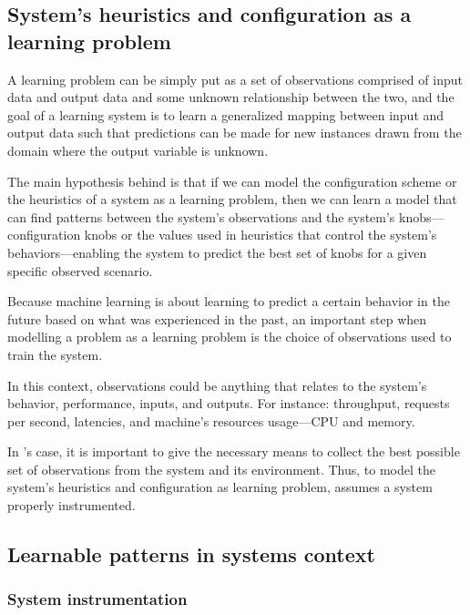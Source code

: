 
\subsection{System's heuristics and configuration as a learning problem}

A learning problem can be simply put as a set of observations comprised of input data and output data and some unknown relationship between the two, and the goal of a learning system is to learn a generalized mapping between input and output data such that predictions can be made for new instances drawn from the domain where the output variable is unknown.

The main hypothesis behind \projectname{} is that if we can model the configuration scheme or the heuristics of a system as a learning problem, then we can learn a model that can find patterns between the system's observations and the system's knobs---configuration knobs or the values used in heuristics that control the system's behaviors---enabling the system to predict the best set of knobs for a given specific observed scenario.

Because machine learning is about learning to predict a certain behavior in the future based on what was experienced in the past, an important step when modelling a problem as a learning problem is the choice of observations used to train the system.

In this context, observations could be anything that relates to the system's behavior, performance, inputs, and outputs. For instance: throughput, requests per second, latencies, and machine's resources usage---CPU and memory.

In \projectname{}'s case, it is important to give the necessary means to collect the best possible set of observations from the system and its environment. Thus, to model the system's heuristics and configuration as learning problem, \projectname{} assumes a system properly instrumented.

\subsection{Learnable patterns in systems context}

\subsubsection{System instrumentation}

